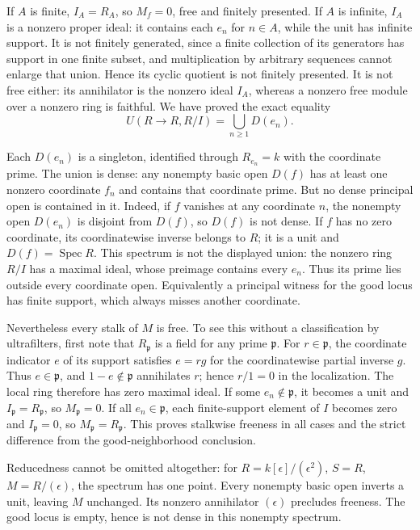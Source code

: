 If \(A\) is finite, \(I_A=R_A\), so \(M_f=0\), free and finitely presented. If \(A\) is infinite, \(I_A\) is a nonzero proper ideal: it contains each \(e_n\) for \(n\in A\), while the unit has infinite support. It is not finitely generated, since a finite collection of its generators has support in one finite subset, and multiplication by arbitrary sequences cannot enlarge that union. Hence its cyclic quotient is not finitely presented. It is not free either: its annihilator is the nonzero ideal \(I_A\), whereas a nonzero free module over a nonzero ring is faithful. We have proved the exact equality \[
 U(R\to R,R/I)=\bigcup_{n\ge1}D(e_n).
\]

Each \(D(e_n)\) is a singleton, identified through \(R_{e_n}=k\) with the coordinate prime. The union is dense: any nonempty basic open \(D(f)\) has at least one nonzero coordinate \(f_n\) and contains that coordinate prime. But no dense principal open is contained in it. Indeed, if \(f\) vanishes at any coordinate \(n\), the nonempty open \(D(e_n)\) is disjoint from \(D(f)\), so \(D(f)\) is not dense. If \(f\) has no zero coordinate, its coordinatewise inverse belongs to \(R\); it is a unit and \(D(f)=\operatorname{Spec}R\). This spectrum is not the displayed union: the nonzero ring \(R/I\) has a maximal ideal, whose preimage contains every \(e_n\). Thus its prime lies outside every coordinate open. Equivalently a principal witness for the good locus has finite support, which always misses another coordinate.

Nevertheless every stalk of \(M\) is free. To see this without a classification by ultrafilters, first note that \(R_{\mathfrak p}\) is a field for any prime \(\mathfrak p\). For \(r\in\mathfrak p\), the coordinate indicator \(e\) of its support satisfies \(e=rg\) for the coordinatewise partial inverse \(g\). Thus \(e\in\mathfrak p\), and \(1-e\notin\mathfrak p\) annihilates \(r\); hence \(r/1=0\) in the localization. The local ring therefore has zero maximal ideal. If some \(e_n\notin\mathfrak p\), it becomes a unit and \(I_{\mathfrak p}=R_{\mathfrak p}\), so \(M_{\mathfrak p}=0\). If all \(e_n\in\mathfrak p\), each finite-support element of \(I\) becomes zero and \(I_{\mathfrak p}=0\), so \(M_{\mathfrak p}=R_{\mathfrak p}\). This proves stalkwise freeness in all cases and the strict difference from the good-neighborhood conclusion.

Reducedness cannot be omitted altogether: for \(R=k[\epsilon]/(\epsilon^2)\), \(S=R\), \(M=R/(\epsilon)\), the spectrum has one point. Every nonempty basic open inverts a unit, leaving \(M\) unchanged. Its nonzero annihilator \((\epsilon)\) precludes freeness. The good locus is empty, hence is not dense in this nonempty spectrum.

